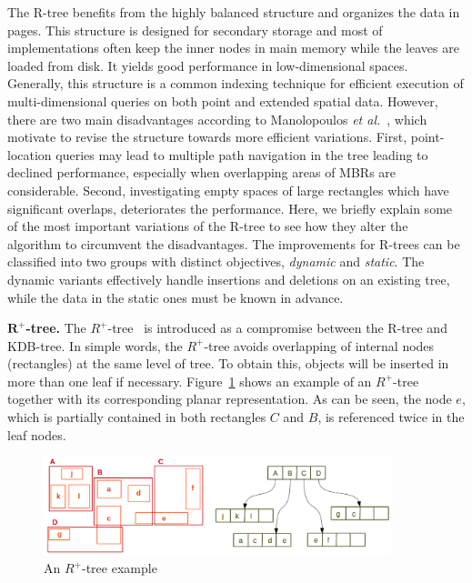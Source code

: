 \documentclass[a4paper,12pt]{article}
\begin{document}
The R-tree benefits from the highly balanced structure and organizes the data in pages. This structure is designed for secondary storage and most of implementations often keep the inner nodes in main memory while the leaves are loaded from disk. It yields good performance in low-dimensional spaces. Generally, this structure is a common indexing technique for efficient execution of multi-dimensional queries on both point and extended spatial data. However, there are two main dis\-advantages according to Manolopoulos \emph{et al.}~\cite{Manolopoulos:2005}, which motivate to revise the structure towards more efficient variations. First, point-location queries may lead to multiple path navigation in the tree leading to declined performance, especially when overlapping areas of MBRs are considerable. Second, investigating empty spaces of large rectangles which have significant overlaps, deteriorates the performance. Here, we briefly explain some of the most important variations of the R-tree to see how they alter the algorithm to circumvent the disadvantages. The improvements for R-trees can be classified into two groups with distinct objectives, \textit{dynamic} and \textit{static}. The dynamic variants effectively handle insertions and deletions on an existing tree, while the data in the static ones must be known in advance. 


\textbf{$\boldsymbol{R^+}$-tree.}
The $R^+$-tree~\cite{Sellis:rplustree} is introduced as a compromise between the R-tree and KDB-tree. In simple words, the $R^+$-tree avoids overlapping of internal nodes (rectangles) at the same level of tree. To obtain this, objects will be inserted in more than one leaf if necessary. Figure~\ref{r+tree} shows an example of an $R^+$-tree together with its corresponding planar representation. As can be seen, the node $e$, which is partially contained in both rectangles $C$ and $B$, is referenced twice in the leaf nodes.


\begin{figure}
\centering
\includegraphics[width=0.9\textwidth]{r+tree}
\caption{An {$R^+$-tree} example}
\label{r+tree}
\end{figure}
\end{document}
